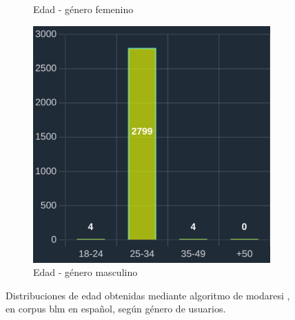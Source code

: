 \begin{figure}[H]
\begin{subfigure}{0.3\textwidth}
  \caption{Edad - género femenino} 
  \end{subfigure}
  \begin{subfigure}{0.3\textwidth}
   \includegraphics[width=\textwidth]{imaxes/capturas-app/graficos/modaresi/grafico-edad-moda-masc.png}
  \caption{Edad - género masculino} 
  \end{subfigure}
  \caption{Distribuciones de edad obtenidas mediante algoritmo de modaresi \cite{modaresi:2016}, en corpus \acrshort{blm} en español, según género de usuarios.}
  \label{fig:blm/resultados-edad-moda}
\end{figure}

